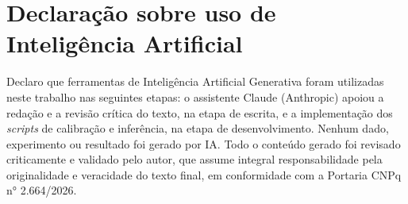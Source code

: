 \documentclass[10pt,conference]{IEEEtran}
\begin{document}

\section*{Declaração sobre uso de Inteligência Artificial}

Declaro que ferramentas de Inteligência Artificial Generativa foram utilizadas neste trabalho nas seguintes etapas: o assistente Claude (Anthropic) apoiou a redação e a revisão crítica do texto, na etapa de escrita, e a implementação dos \textit{scripts} de calibração e inferência, na etapa de desenvolvimento. Nenhum dado, experimento ou resultado foi gerado por IA. Todo o conteúdo gerado foi revisado criticamente e validado pelo autor, que assume integral responsabilidade pela originalidade e veracidade do texto final, em conformidade com a Portaria CNPq n° 2.664/2026.



\end{document}

